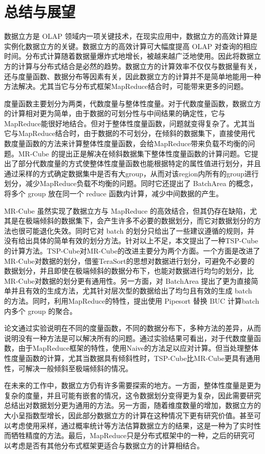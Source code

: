 
\chapter{总结与展望}

数据立方是 OLAP 领域内一项关键技术，在现实应用中，数据立方的高效计算是实例化数据立方的关键。数据立方的高效计算可大幅度提高 OLAP 对查询的相应时间。分布式计算随着数据量爆炸式地增长，被越来越广泛地使用。因此将数据立方的计算与分布式结合是必然的趋势。数据立方的计算效率不仅仅与数据量有关，还与度量函数、数据分布等因素有关，因此数据立方的计算并不是简单地能用一种方法解决。尤其当它与分布式框架MapReduce结合时，可能带来更多的问题。

度量函数主要划分为两类，代数度量与整体性度量。对于代数度量函数，数据立方的计算相对更为简单，由于数据的可划分性与中间结果的确定性，它与MapReduce能很好地结合。但对于整体性度量函数，问题就变得复杂了。尤其当它与MapReduce结合时，由于数据的不可划分，在倾斜的数据集下，直接使用代数度量函数的方法来计算整体性度量函数，会给MapReduce带来负载不均衡的问题。MR-Cube 的提出正是解决在倾斜数据集下整体性度量函数的计算问题。它提出了部分代数度量的方式使整体性度量函数也能根据特定的属性值进行划分，并且通过采样的方式确定数据集中是否有大group，从而对该region内所有的group进行划分，减少MapReduce负载不均衡的问题。同时它还提出了 BatchArea 的概念，将多个 group 放在同一个 reduce 函数内计算，减少中间数据的产生。

MR-Cube 虽然实现了数据立方与 MapReduce 的高效结合，但其仍存在缺陷，尤其是在极端倾斜的数据集下，会产生许多不必要的数据划分，而它对数据划分的方法也很可能退化失效。同时它对 batch 的划分只给出了一些建议遵循的规则，并没有给出具体的简单有效的划分方法。针对以上不足，本文提出了一种TSP-Cube的计算方法。TSP-Cube对MR-Cube的改进主要分为两个方面。一个方面是改进了MR-Cube对数据的划分，借鉴TeraSort的思想对数据进行划分，可避免不必要的数据划分，并且即使在极端倾斜的数据分布下，也能对数据进行均匀的划分，比MR-Cube对数据的划分更有通用性。另一方面，对 BatchArea 提出了更为直接简单并且有效的生成方法，尤其针对层次型的数据给出了均匀且有效的生成 batch 的方法。同时，利用MapReduce的特性，提出使用 Pipesort 替换 BUC 计算batch内多个 group 的聚合。

论文通过实验说明在不同的度量函数，不同的数据分布下，多种方法的差异，从而说明没有一种方法是可以解决所有的问题。通过实验结果可看出，对于代数度量函数，由于MapReduce框架的特性，使用Naive的方法足以应对计算。但当处理整体性度量函数的计算，尤其当数据具有倾斜性时，TSP-Cube比MR-Cube更具有通用性，可解决一般倾斜至极端倾斜的情况。

在未来的工作中，数据立方仍有许多需要探索的地方。一方面，整体性度量是更为复杂的度量，并且可能有嵌套的情况，这令数据划分变得更为复杂，因此需要研究总结出对数据划分更为通用的方法。另一方面，随着维度数量的增加，数据立方的大小呈指数型增长，因此部分数据立方的计算在这种情况下更有研究价值。甚至可以考虑使用采样，通过概率统计等方法估算数据立方的结果，这是一种为了实时性而牺牲精度的方法。最后，MapReduce只是分布式框架中的一种，之后的研究可以考虑是否有其他分布式框架更适合与数据立方的计算相结合。
